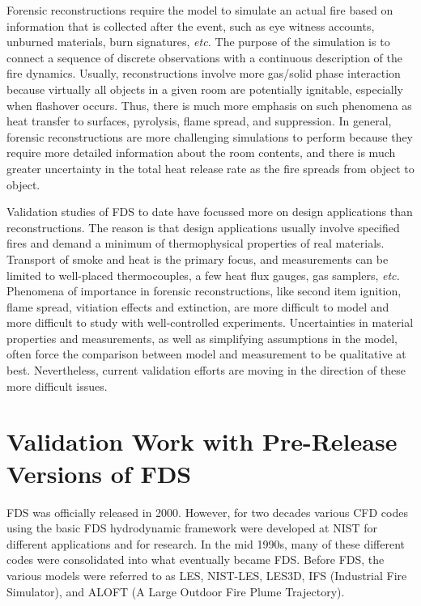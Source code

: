 Forensic reconstructions require the  model to simulate an actual fire based on  information that is collected  after the event,  such as eye witness
accounts, unburned materials,  burn signatures, {\em etc.} The purpose  of  the simulation  is  to  connect  a sequence  of  discrete observations
with  a continuous  description  of  the fire  dynamics. Usually,  reconstructions  involve  more gas/solid  phase  interaction because  virtually
all  objects  in  a  given  room  are  potentially ignitable, especially when flashover  occurs. Thus, there is much more emphasis on  such phenomena
as  heat transfer to  surfaces, pyrolysis, flame  spread, and suppression.  In general,  forensic reconstructions are more challenging simulations
to perform because they require more detailed  information  about the  room  contents,  and  there is  much greater uncertainty in the total heat
release rate as the fire spreads from object to object.

Validation  studies  of FDS  to  date  have  focussed more  on  design applications   than  reconstructions.  The   reason  is   that  design
applications usually involve specified  fires and demand a minimum of thermophysical properties  of real materials.  Transport  of smoke and heat is
the  primary  focus,  and measurements  can  be  limited  to well-placed thermocouples, a few  heat flux gauges, gas samplers, {\em etc.} Phenomena
of importance in forensic reconstructions, like second item  ignition, flame  spread, vitiation  effects and  extinction, are more difficult  to
model  and   more  difficult   to   study  with well-controlled experiments. Uncertainties  in material properties and measurements, as well as
simplifying assumptions in  the model, often force the  comparison between model and measurement  to be qualitative at best.  Nevertheless, current
validation  efforts are moving  in the direction of these more difficult issues.



\section{Validation Work with Pre-Release Versions of FDS}

FDS was officially released in  2000. However, for two decades various CFD codes using the basic FDS hydrodynamic framework were developed at NIST
for  different applications and  for research. In the  mid 1990s, many of  these different codes were consolidated  into what eventually became FDS.
Before FDS, the various  models were referred  to as LES, NIST-LES, LES3D,  IFS (Industrial Fire Simulator), and  ALOFT (A Large Outdoor Fire Plume
Trajectory).

